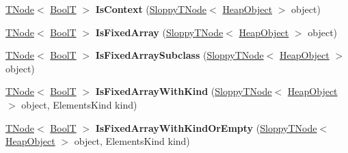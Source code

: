 \begin{DoxyCompactItemize}
\mbox{\hyperlink{classv8_1_1internal_1_1compiler_1_1TNode}{T\+Node}}$<$ \mbox{\hyperlink{structv8_1_1internal_1_1BoolT}{BoolT}} $>$ {\bfseries Is\+Context} (\mbox{\hyperlink{classv8_1_1internal_1_1compiler_1_1SloppyTNode}{Sloppy\+T\+Node}}$<$ \mbox{\hyperlink{classv8_1_1internal_1_1HeapObject}{Heap\+Object}} $>$ object)
\item 
\mbox{\label{classv8_1_1internal_1_1CodeStubAssembler_a8a6a8432555345ba7ebad6aaf7560a03}} 
\mbox{\hyperlink{classv8_1_1internal_1_1compiler_1_1TNode}{T\+Node}}$<$ \mbox{\hyperlink{structv8_1_1internal_1_1BoolT}{BoolT}} $>$ {\bfseries Is\+Fixed\+Array} (\mbox{\hyperlink{classv8_1_1internal_1_1compiler_1_1SloppyTNode}{Sloppy\+T\+Node}}$<$ \mbox{\hyperlink{classv8_1_1internal_1_1HeapObject}{Heap\+Object}} $>$ object)
\item 
\mbox{\label{classv8_1_1internal_1_1CodeStubAssembler_ad9ab5e50d64cda4236dc97ae8f2bb425}} 
\mbox{\hyperlink{classv8_1_1internal_1_1compiler_1_1TNode}{T\+Node}}$<$ \mbox{\hyperlink{structv8_1_1internal_1_1BoolT}{BoolT}} $>$ {\bfseries Is\+Fixed\+Array\+Subclass} (\mbox{\hyperlink{classv8_1_1internal_1_1compiler_1_1SloppyTNode}{Sloppy\+T\+Node}}$<$ \mbox{\hyperlink{classv8_1_1internal_1_1HeapObject}{Heap\+Object}} $>$ object)
\item 
\mbox{\label{classv8_1_1internal_1_1CodeStubAssembler_ae8619e31f18fdc5c16a357245e853f6d}} 
\mbox{\hyperlink{classv8_1_1internal_1_1compiler_1_1TNode}{T\+Node}}$<$ \mbox{\hyperlink{structv8_1_1internal_1_1BoolT}{BoolT}} $>$ {\bfseries Is\+Fixed\+Array\+With\+Kind} (\mbox{\hyperlink{classv8_1_1internal_1_1compiler_1_1SloppyTNode}{Sloppy\+T\+Node}}$<$ \mbox{\hyperlink{classv8_1_1internal_1_1HeapObject}{Heap\+Object}} $>$ object, Elements\+Kind kind)
\item 
\mbox{\label{classv8_1_1internal_1_1CodeStubAssembler_ab2865900a04dd28a36b0bc082903c3fb}} 
\mbox{\hyperlink{classv8_1_1internal_1_1compiler_1_1TNode}{T\+Node}}$<$ \mbox{\hyperlink{structv8_1_1internal_1_1BoolT}{BoolT}} $>$ {\bfseries Is\+Fixed\+Array\+With\+Kind\+Or\+Empty} (\mbox{\hyperlink{classv8_1_1internal_1_1compiler_1_1SloppyTNode}{Sloppy\+T\+Node}}$<$ \mbox{\hyperlink{classv8_1_1internal_1_1HeapObject}{Heap\+Object}} $>$ object, Elements\+Kind kind)

\end{DoxyCompactItemize}
